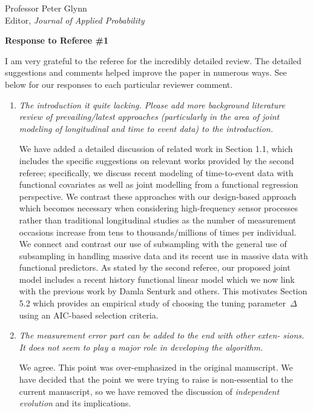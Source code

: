 \documentclass[11pt]{letter} %
\begin{document}
\begin{letter}{Professor
	Peter Glynn\\
	Editor, {\em Journal of Applied Probability}}
\begin{enumerate}
\end{enumerate}

\newpage
{\bf Response to Referee \#1}
\vspace{5mm}

I am very grateful to the referee for the incredibly detailed review.  The detailed suggestions and comments helped improve the paper in numerous ways.  See below for our responses to each particular reviewer comment.

\begin{enumerate}
\item {\it The introduction it quite lacking. Please add more background literature review of prevailing/latest approaches (particularly in the area of joint modeling of longitudinal and time to event data) to the introduction.}

\vspace{5mm}
We have added a detailed discussion of related work in Section 1.1, which includes the specific suggestions on relevant works provided by the second referee; specifically, we discuss recent modeling of time-to-event data with functional covariates as well as joint modelling from a functional regression perspective.  We contrast these approaches with our design-based approach which becomes necessary when considering high-frequency sensor processes rather than traditional longitudinal studies as the number of measurement occasions increase from tens to thousands/millions of times per individual.  We connect and contrast our use of subsampling with the general use of subsampling in handling massive data and its recent use in massive data with functional predictors.  As stated by the second referee, our proposed joint model includes a recent history functional linear model which we now link with the previous work by Damla Senturk and others.  This motivates Section 5.2 which provides an empirical study of choosing the tuning parameter~$\Delta$ using an AIC-based selection criteria.
\vspace{5mm}

\item {\it The measurement error part can be added to the end with other exten-
sions. It does not seem to play a major role in developing the algorithm.}

\vspace{5mm}
We agree.  This point was over-emphasized in the original manuscript. We have decided that the point we were trying to raise is non-essential to the current manuscript, so we have removed the discussion of \emph{independent evolution} and its implications.
\vspace{5mm}


\end{enumerate}
\end{letter}
\end{document}
